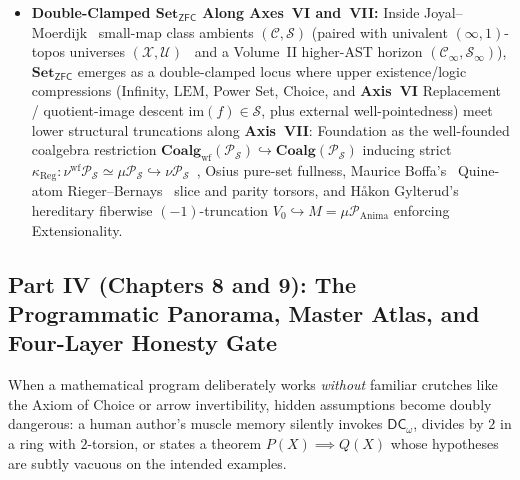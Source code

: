 \documentclass[10pt,twoside,openright]{book}
\theoremstyle{crmplain}
\theoremstyle{crmdef}
\theoremstyle{crmremark}
\begin{document}
\begin{itemize}
  \item \textbf{Double-Clamped $\mathbf{Set}_{\mathsf{ZFC}}$ Along Axes~VI and~VII:} Inside Joyal--Moerdijk~\cite{JoyalMoerdijk95} small-map class ambients $(\mathcal{C}, \mathcal{S})$ (paired with univalent $(\infty, 1)$-topos universes $(\mathcal{X}, \mathcal{U})$~\cite{Lurie09,Gylterud18} and a Volume~II higher-AST horizon $(\mathcal{C}_\infty, \mathcal{S}_\infty)$), $\mathbf{Set}_{\mathsf{ZFC}}$ emerges as a double-clamped locus where upper existence/logic compressions (Infinity, $\mathrm{LEM}$, Power Set, Choice, and \textbf{Axis~VI} Replacement / quotient-image descent $\mathrm{im}(f) \in \mathcal{S}$, plus external well-pointedness) meet lower structural truncations along \textbf{Axis~VII}: Foundation as the well-founded coalgebra restriction $\mathbf{Coalg}_{\mathrm{wf}}(\mathcal{P}_{\mathcal{S}}) \hookrightarrow \mathbf{Coalg}(\mathcal{P}_{\mathcal{S}})$ inducing strict $\kappa_{\mathrm{Reg}} : \nu^{\mathrm{wf}}\mathcal{P}_{\mathcal{S}} \simeq \mu\mathcal{P}_{\mathcal{S}} \hookrightarrow \nu\mathcal{P}_{\mathcal{S}}$~\cite{Osius74,Aczel88}, Osius pure-set fullness, Maurice Boffa's~\cite{Boffa69} Quine-atom Rieger--Bernays~\cite{Bernays54,Rieger57} slice and parity torsors, and H\aa kon Gylterud's~\cite{Gylterud18} hereditary fiberwise $(-1)$-truncation $V_0 \hookrightarrow M = \mu\mathcal{P}_{\mathrm{Anima}}$ enforcing Extensionality.
\end{itemize}

\subsection*{Part IV (Chapters 8 and 9): The Programmatic Panorama, Master Atlas, and Four-Layer Honesty Gate}

When a mathematical program deliberately works \emph{without} familiar crutches like the Axiom of Choice or arrow invertibility, hidden assumptions become doubly dangerous: a human author's muscle memory silently invokes $\mathsf{DC}_\omega$, divides by $2$ in a ring with $2$-torsion, or states a theorem $P(X) \implies Q(X)$ whose hypotheses are subtly vacuous on the intended examples.
\end{document}
